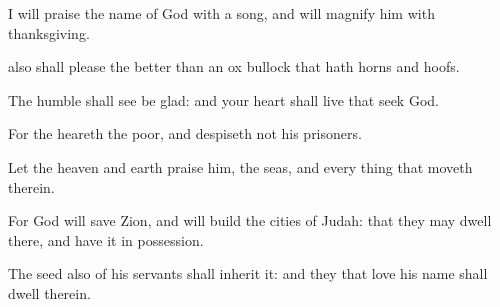 {\Q {}I will
praise the
name of
God with a
song, and will
magnify him with
thanksgiving.


\par }{\Q {} also shall
please the
{}
better than an
ox
{}
bullock that hath
horns and
hoofs.


\par }{\Q {}The
humble shall
see
{} be
glad: and your
heart shall
live that
seek
God.


\par }{\Q {}For the
{}
heareth the
poor, and
despiseth not his
prisoners.


\par }{\Q {}Let the
heaven and
earth
praise him, the
seas, and every thing that
moveth therein.


\par }{\Q {}For
God will
save
Zion, and will
build the
cities of
Judah: that they may
dwell there, and have it in
possession.


\par }{\Q {}The
seed also of his
servants shall
inherit it: and they that
love his
name shall
dwell therein.




\par }
